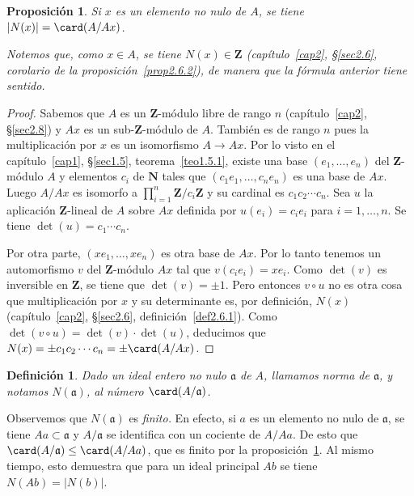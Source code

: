 \documentclass[oneside,bibtotoc,leqno,spanish]{amsbook}
\newcommand{\ZZ}{\mathbf{Z}}
\newcommand{\NN}{\mathbf{N}}
\newcommand{\idl}[1]{\mathfrak{#1}}
\newcommand{\QED}{}%
\newcommand{\abs}[1]{\left\lvert#1\right\rvert}
\renewcommand{\to}[1][]{\xrightarrow{#1}}
\numberwithin{equation}{section}
\newenvironment{comm}%
	{\begin{trivlist}\item\small\itshape}
	{\end{trivlist}}
\theoremstyle{defi}
\newtheorem{definition}{Definici\'on}
\theoremstyle{note}
\newtheorem{proposition}{Proposici\'on}
\theoremstyle{rem}
\numberwithin{theorem}{section}
\numberwithin{proposition}{section}
\numberwithin{definition}{section}
\numberwithin{lemma}{section}
\numberwithin{corollary}{section}
\numberwithin{example}{section}
\numberwithin{footnote}{section}%
\begin{document}
\begin{proposition}\label{prop3.5.1}
Si $x$ es un elemento no nulo de $A$, se tiene $\abs{N(x)} = \card(A/Ax)$.
\end{proposition}

\begin{comm}
Notemos que, como $x\in A$, se tiene $N(x)\in\ZZ$ (cap\'itulo~\ref{cap2}, \S\ref{sec2.6}, corolario de la
proposici\'on~\ref{prop2.6.2}), de manera que
la f\'ormula anterior tiene sentido.
\end{comm}

\begin{proof}
Sabemos que $A$ es un $\ZZ$-m\'odulo libre de rango $n$ (cap\'itulo~\ref{cap2}, \S\ref{sec2.8}) y $Ax$ es un
sub-$\ZZ$-m\'odulo de $A$. Tambi\'en es de rango $n$ pues la multiplicaci\'on por $x$
es un isomorfismo $A\to Ax$. Por lo visto en el cap\'itulo~\ref{cap1}, \S\ref{sec1.5}, teorema~\ref{teo1.5.1}, existe una base
$(e_{1},\dots,e_{n})$ del $\ZZ$-m\'odulo $A$ y elementos $c_{i}$ de $\NN$ tales que
$(c_{1}e_{1},\dots,c_{n}e_{n})$ es una base de $Ax$. Luego $A/Ax$ es isomorfo a
$\prod_{i=1}^{n}\ZZ/c_{i}\ZZ$ y su cardinal es $c_{1}c_{2}\cdots c_{n}$. Sea $u$ la
aplicaci\'on $\ZZ$-lineal de $A$ sobre $Ax$ definida por $u(e_{i}) = c_{i}e_{i}$ para
$i=1,\dots,n$. Se tiene $\det(u) = c_{1}\cdots c_{n}$.

Por otra parte, $(xe_{1},\dots,xe_{n})$ es otra base de $Ax$. Por lo tanto tenemos un automorfismo
$v$ del $\ZZ$-m\'odulo $Ax$ tal que $v(c_{i}e_{i}) = xe_{i}$. Como $\det(v)$ es inversible en $\ZZ$,
se tiene que $\det(v)=\pm 1$. Pero entonces $v\circ u$ no es otra cosa que multiplicaci\'on por $x$
y su determinante es, por definici\'on, $N(x)$ (cap\'itulo~\ref{cap2}, \S\ref{sec2.6},
definici\'on~\ref{def2.6.1}). Como $\det(v\circ u)=
\det(v)\cdot\det(u)$, deducimos que $N(x) = \pm c_{1}c_{2}\cdots c_{n}=\pm \card(A/Ax)$.%
\end{proof}

\begin{definition}\label{def3.5.1}
Dado un ideal entero no nulo $\idl{a}$ de $A$, llamamos norma de $\idl{a}$, y notamos $N(\idl{a})$,
al n\'umero $\card(A/\idl{a})$.
\end{definition}

Observemos que $N(\idl{a})$ es {\em finito.} En efecto, si $a$ es un elemento no nulo de $\idl{a}$,
se tiene $Aa\subset\idl{a}$ y $A/\idl{a}$ se identifica con un cociente de $A/Aa$. De esto que
$\card(A/\idl{a})\leq\card(A/Aa)$, que es finito por la proposici\'on~\ref{prop3.5.1}. Al mismo tiempo, esto demuestra que
para un ideal principal $Ab$ se tiene $N(Ab) = \abs{N(b)}$.
\end{document}

